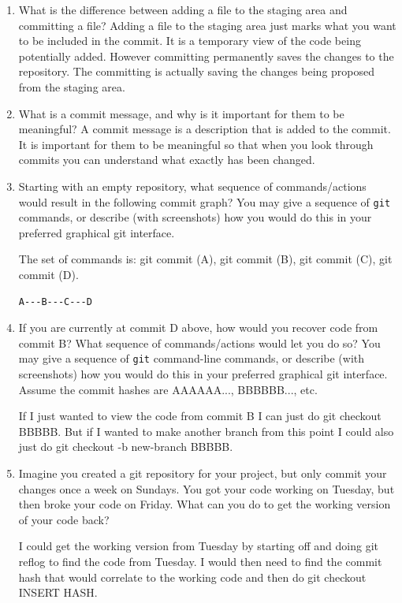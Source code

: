 \documentclass[10pt,twocolumn]{article}
\begin{document}
\begin{enumerate}
\item What is the difference between adding a file to the staging area and committing a file?
\subitem Adding a file to the staging area just marks what you want to be included in the commit. It is a temporary view of the code being potentially added. However committing permanently saves the changes to the repository. The committing is actually saving the changes being proposed from the staging area.


\item What is a commit message, and why is it important for them to be meaningful?
\subitem A commit message is a description that is added to the commit. It is important for them to be meaningful so that when you look through commits you can understand what exactly has been changed.

\item Starting with an empty repository, what sequence of commands/actions would result in the following commit graph? You may give a sequence of \texttt{git} commands, or describe (with screenshots) how you would do this in your preferred graphical git interface.

\subitem The set of commands is: git commit (A), git commit (B), git commit (C), git commit (D).


\begin{verbatim}
A---B---C---D
\end{verbatim}



\item If you are currently at commit D above, how would you recover code from commit B? What sequence of commands/actions would let you do so? You may give a sequence of \texttt{git} command-line commands, or describe (with screenshots) how you would do this in your preferred graphical git interface. Assume the commit hashes are AAAAAA..., BBBBBB..., etc.

\subitem If I just wanted to view the code from commit B I can just do git checkout BBBBB. But if I wanted to make another branch from this point I could also just do git checkout -b new-branch BBBBB.

\item Imagine you created a git repository for your project, but only commit your changes once a week on Sundays. You got your code working on Tuesday, but then broke your code on Friday. What can you do to get the working version of your code back?

\subitem I could get the working version from Tuesday by starting off and doing git reflog to find the code from Tuesday. I would then need to find the commit hash that would correlate to the working code and then do git checkout INSERT HASH. 

\end{enumerate}
\end{document}
